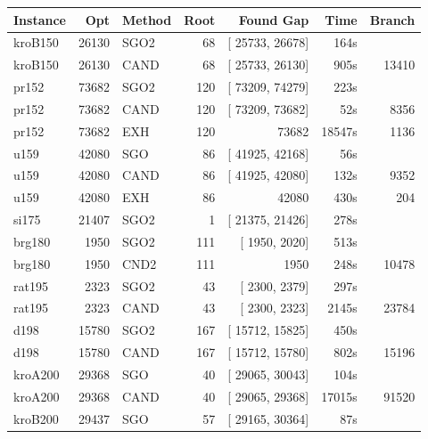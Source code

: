 \documentclass[a4paper,11pt,twoside]{book}
\begin{document}
\begin{multicols}{2}
\vfill
\begin{center}
\small
\begin{tabular}{|lrlrrrr|}
\hline
{\bf Instance} & {\bf Opt} & {\bf Method} & {\bf Root} & {\bf Found Gap} & {\bf Time} & {\bf Branch} \\
\hline
\hline
kroB150      &    26130 & SGO2 &  68 & [ 25733, 26678] &   164s & \\
kroB150      &    26130 & CAND &  68 & [ 25733, 26130] &   905s &   13410 \\
pr152        &    73682 & SGO2 & 120 & [ 73209, 74279] &   223s & \\
pr152        &    73682 & CAND & 120 & [ 73209, 73682] &    52s &    8356 \\
pr152        &    73682 &  EXH & 120 &           73682 & 18547s &    1136 \\
u159         &    42080 &  SGO &  86 & [ 41925, 42168] &    56s & \\
u159         &    42080 & CAND &  86 & [ 41925, 42080] &   132s &   9352 \\
u159         &    42080 &  EXH &  86 &           42080 &   430s &    204 \\
si175        &    21407 & SGO2 &   1 & [ 21375, 21426] &   278s & \\
brg180       &     1950 & SGO2 & 111 & [  1950,  2020] &   513s & \\
brg180       &     1950 & CND2 & 111 &            1950 &   248s &   10478 \\
rat195       &     2323 & SGO2 &  43 & [  2300,  2379] &   297s & \\
rat195       &     2323 & CAND &  43 & [  2300,  2323] &  2145s &   23784 \\
d198         &    15780 & SGO2 & 167 & [ 15712, 15825] &   450s & \\
d198         &    15780 & CAND & 167 & [ 15712, 15780] &   802s &   15196 \\
kroA200      &    29368 &  SGO &  40 & [ 29065, 30043] &   104s & \\
kroA200      &    29368 & CAND &  40 & [ 29065, 29368] & 17015s &   91520 \\
kroB200      &    29437 &  SGO &  57 & [ 29165, 30364] &    87s & \\
\hline
\end{tabular}
\end{center}



\end{multicols}
\end{document}
